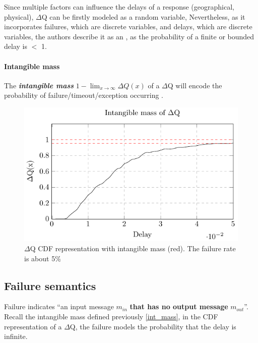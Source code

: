     Since multiple factors can influence the delays of a response (geographical, physical), $\Delta$Q can be firstly modeled as a random variable,  Nevertheless, as it incorporates failures, which are discrete variables, and delays, which are discrete variables, the authors describe it as an , as the probability of a finite or bounded delay is $<$ 1. \cite{myo}
   
    \paragraph{Intangible mass} The \textbf{\textit{intangible mass}} $1 - \lim_{x\to\infty}\Delta Q(x)$ of a $\Delta$Q will encode the probability of failure/timeout/exception occurring \cite{art}. \label{int_mass}
        
    \begin{figure}[H]
        \begin{center}
            \includegraphics{tikz/intangible.pdf}
        \end{center}
        \caption{$\Delta$Q CDF representation with intangible mass (red). The failure rate is about 5\% }
    \end{figure}
   
  \subsection{Failure semantics}
       Failure indicates ``an input message $m_{in}$ \textbf{that has no output message} $m_{out}$''. \cite{art}
       Recall the intangible mass defined previously \ref{int_mass}, in the CDF representation of a $\Delta$Q, the failure models the probability that the delay is infinite.
   
